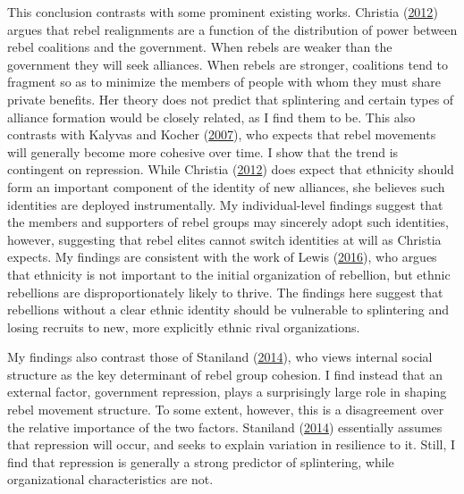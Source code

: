 \documentclass[12pt,]{book}
\theoremstyle{definition}
\theoremstyle{definition}
\theoremstyle{definition}
\theoremstyle{remark}
\begin{document}
This conclusion contrasts with some prominent existing works. Christia
(\protect\hyperlink{ref-Christia2012}{2012}) argues that rebel
realignments are a function of the distribution of power between rebel
coalitions and the government. When rebels are weaker than the
government they will seek alliances. When rebels are stronger,
coalitions tend to fragment so as to minimize the members of people with
whom they must share private benefits. Her theory does not predict that
splintering and certain types of alliance formation would be closely
related, as I find them to be. This also contrasts with Kalyvas and
Kocher (\protect\hyperlink{ref-Kalyvas2007}{2007}), who expects that
rebel movements will generally become more cohesive over time. I show
that the trend is contingent on repression. While Christia
(\protect\hyperlink{ref-Christia2012}{2012}) does expect that ethnicity
should form an important component of the identity of new alliances, she
believes such identities are deployed instrumentally. My
individual-level findings suggest that the members and supporters of
rebel groups may sincerely adopt such identities, however, suggesting
that rebel elites cannot switch identities at will as Christia expects.
My findings are consistent with the work of Lewis
(\protect\hyperlink{ref-Lewis2016}{2016}), who argues that ethnicity is
not important to the initial organization of rebellion, but ethnic
rebellions are disproportionately likely to thrive. The findings here
suggest that rebellions without a clear ethnic identity should be
vulnerable to splintering and losing recruits to new, more explicitly
ethnic rival organizations.

My findings also contrast those of Staniland
(\protect\hyperlink{ref-Staniland2014}{2014}), who views internal social
structure as the key determinant of rebel group cohesion. I find instead
that an external factor, government repression, plays a surprisingly
large role in shaping rebel movement structure. To some extent, however,
this is a disagreement over the relative importance of the two factors.
Staniland (\protect\hyperlink{ref-Staniland2014}{2014}) essentially
assumes that repression will occur, and seeks to explain variation in
resilience to it. Still, I find that repression is generally a strong
predictor of splintering, while organizational characteristics are not.
\end{document}
